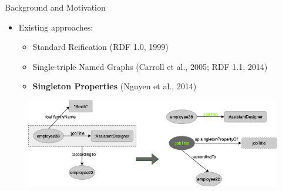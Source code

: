 \documentclass[aspectratio=169]{beamer}
\begin{document}
\begin{frame}{Background and Motivation}
    \begin{itemize}
        \item Existing approaches:
            \begin{itemize}
                \item Standard Reification (RDF 1.0, 1999)
                \item Single-triple Named Graphs (Carroll et al., 2005; RDF 1.1, 2014)
                \item \textbf{Singleton Properties} (Nguyen et al., 2014)
            \end{itemize}
    \end{itemize}
    \begin{figure}
        \centering
        \includegraphics[scale=0.5]{lecture/images/Example-2-To-SingletonProperties.png}
    \end{figure}
\end{frame}
\end{document}
